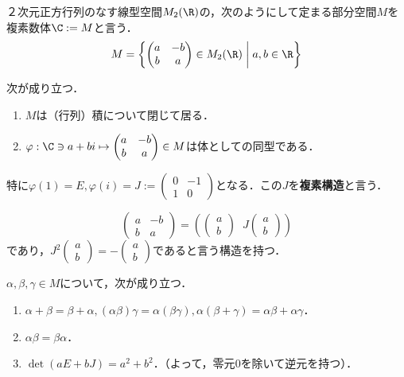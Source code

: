\documentclass[uplatex, dvipdfmx]{jsreport}
\begin{document}
\begin{definition}
    ２次元正方行列のなす線型空間$M_2(\R)$の，次のようにして定まる部分空間$M$を複素数体$\C:=M$と言う．
    \[ M=\left\{ \begin{pmatrix}a&-b\\b&a\end{pmatrix}\in M_2(\R)\;\middle|\; a,b\in \R \right\} \]
\end{definition}
\begin{proposition}
    次が成り立つ．
    \begin{enumerate}
        \item $M$は（行列）積について閉じて居る．
        \item $\varphi:\C\ni a+bi\mapsto\begin{pmatrix}a&-b\\b&a\end{pmatrix}\in M$は体としての同型である．
    \end{enumerate}
    特に$\varphi(1)=E,\varphi(i)=J:=\begin{pmatrix}0&-1\\1&0\end{pmatrix}$となる．この$J$を\textbf{複素構造}と言う．
\end{proposition}
\begin{remark}
    \[ \begin{pmatrix}a&-b\\b&a\end{pmatrix} = \left( \begin{pmatrix}a\\b\end{pmatrix} \;\; J\begin{pmatrix}a\\b\end{pmatrix} \right) \]
    であり，$J^2\begin{pmatrix}a\\b\end{pmatrix}=-\begin{pmatrix}a\\b\end{pmatrix}$であると言う構造を持つ．
\end{remark}
\begin{lemma}
    $\alpha,\beta,\gamma\in M$について，次が成り立つ．
    \begin{enumerate}
        \item $\alpha+\beta=\beta+\alpha, (\alpha\beta)\gamma=\alpha(\beta\gamma), \alpha(\beta+\gamma)=\alpha\beta+\alpha\gamma$．
        \item $\alpha\beta=\beta\alpha$．
        \item $\det(aE+bJ)=a^2+b^2$．（よって，零元$0$を除いて逆元を持つ）．
    \end{enumerate}
\end{lemma}
\end{document}

